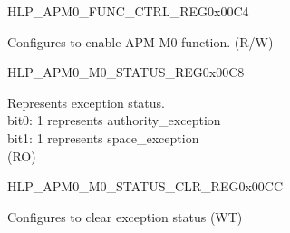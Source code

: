 \begin{register}{H}{LP\_APM0\_FUNC\_CTRL\_REG}{0x00C4}\label{regdesc:LPAPM0FUNCCTRLREG}
%
%
\regnewline%
\begin{regdesc}\begin{reglist}
\label{fielddesc:LPAPM0M0FUNCEN}\item [LP\_APM0\_M0\_FUNC\_EN] Configures to enable APM M0 function. (R/W)
\end{reglist}\end{regdesc}
\end{register}


\begin{register}{H}{LP\_APM0\_M0\_STATUS\_REG}{0x00C8}\label{regdesc:LPAPM0M0STATUSREG}
%
%
\regnewline%
\begin{regdesc}\begin{reglist}
\label{fielddesc:LPAPM0M0EXCEPTIONSTATUS}\item [LP\_APM0\_M0\_EXCEPTION\_STATUS] Represents exception status.\\ 
bit0: 1 represents authority\_exception \\ 
bit1: 1 represents space\_exception  \\ (RO)
\end{reglist}\end{regdesc}
\end{register}


\begin{register}{H}{LP\_APM0\_M0\_STATUS\_CLR\_REG}{0x00CC}\label{regdesc:LPAPM0M0STATUSCLRREG}
%
%
\regnewline%
\begin{regdesc}\begin{reglist}
\label{fielddesc:LPAPM0M0REGIONSTATUSCLR}\item [LP\_APM0\_M0\_REGION\_STATUS\_CLR] Configures to clear exception status (WT)
\end{reglist}\end{regdesc}
\end{register}


